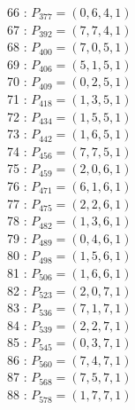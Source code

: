 \documentclass{article}
\begin{document}
{\begin{multicols}{3}
66 : $P_{377}=( 0, 6, 4, 1 )$\\
67 : $P_{392}=( 7, 7, 4, 1 )$\\
68 : $P_{400}=( 7, 0, 5, 1 )$\\
69 : $P_{406}=( 5, 1, 5, 1 )$\\
70 : $P_{409}=( 0, 2, 5, 1 )$\\
71 : $P_{418}=( 1, 3, 5, 1 )$\\
72 : $P_{434}=( 1, 5, 5, 1 )$\\
73 : $P_{442}=( 1, 6, 5, 1 )$\\
74 : $P_{456}=( 7, 7, 5, 1 )$\\
75 : $P_{459}=( 2, 0, 6, 1 )$\\
76 : $P_{471}=( 6, 1, 6, 1 )$\\
77 : $P_{475}=( 2, 2, 6, 1 )$\\
78 : $P_{482}=( 1, 3, 6, 1 )$\\
79 : $P_{489}=( 0, 4, 6, 1 )$\\
80 : $P_{498}=( 1, 5, 6, 1 )$\\
81 : $P_{506}=( 1, 6, 6, 1 )$\\
82 : $P_{523}=( 2, 0, 7, 1 )$\\
83 : $P_{536}=( 7, 1, 7, 1 )$\\
84 : $P_{539}=( 2, 2, 7, 1 )$\\
85 : $P_{545}=( 0, 3, 7, 1 )$\\
86 : $P_{560}=( 7, 4, 7, 1 )$\\
87 : $P_{568}=( 7, 5, 7, 1 )$\\
88 : $P_{578}=( 1, 7, 7, 1 )$\\
\end{multicols}


%


%


}%
\end{document}

